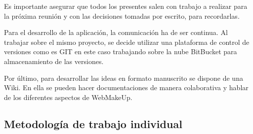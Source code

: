 Es importante asegurar que todos los presentes salen con trabajo a realizar para la próxima reunión y con las decisiones tomadas por escrito, para recordarlas.

Para el desarrollo de la aplicación, la comunicación ha de ser continua. Al trabajar sobre el mismo proyecto, se decide utilizar una plataforma de control de versiones como es GIT en este caso trabajando sobre la nube BitBucket para almacenamiento de las versiones.

Por último, para desarrollar las ideas en formato manuscrito se dispone de una Wiki. En ella se pueden hacer documentaciones de manera colaborativa y hablar de los diferentes aspectos de WebMakeUp.

\subsection{Metodología de trabajo individual}
\label{sec:TrabajoIndividual}

